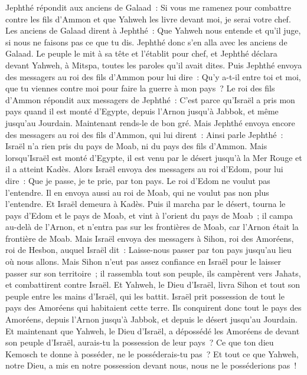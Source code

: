\begin{multicols}{2}
Jephthé répondit aux anciens de Galaad~: Si vous me ramenez pour combattre contre les fils d'Ammon et que Yahweh les livre devant moi, je serai votre chef.
Les anciens de Galaad dirent à Jephthé~: Que Yahweh nous entende et qu'il juge, si nous ne faisons pas ce que tu dis.
Jephthé donc s'en alla avec les anciens de Galaad. Le peuple le mit à sa tête et l'établit pour chef, et Jephthé déclara devant Yahweh, à Mitspa, toutes les paroles qu'il avait dites.
Puis Jephthé envoya des messagers au roi des fils d'Ammon pour lui dire~: Qu'y a-t-il entre toi et moi, que tu viennes contre moi pour faire la guerre à mon pays~?
Le roi des fils d'Ammon répondit aux messagers de Jephthé~: C'est parce qu'Israël a pris mon pays quand il est monté d'Egypte, depuis l'Arnon jusqu'à Jabbok, et même jusqu'au Jourdain. Maintenant rends-le de bon gré.
Mais Jephthé envoya encore des messagers au roi des fils d'Ammon,
qui lui dirent~: Ainsi parle Jephthé~: Israël n'a rien pris du pays de Moab, ni du pays des fils d'Ammon.
Mais lorsqu'Israël est monté d'Egypte, il est venu par le désert jusqu'à la Mer Rouge et il a atteint Kadès.
Alors Israël envoya des messagers au roi d'Edom, pour lui dire~: Que je passe, je te prie, par ton pays. Le roi d'Edom ne voulut pas l'entendre. Il en envoya aussi au roi de Moab, qui ne voulut pas non plus l'entendre. Et Israël demeura à Kadès.
Puis il marcha par le désert, tourna le pays d'Edom et le pays de Moab, et vint à l'orient du pays de Moab~; il campa au-delà de l'Arnon, et n'entra pas sur les frontières de Moab, car l'Arnon était la frontière de Moab.
Mais Israël envoya des messagers à Sihon, roi des Amoréens, roi de Hesbon, auquel Israël dit~: Laisse-nous passer par ton pays jusqu'au lieu où nous allons.
Mais Sihon n'eut pas assez confiance en Israël pour le laisser passer sur son territoire~; il rassembla tout son peuple, ils campèrent vers Jahats, et combattirent contre Israël.
Et Yahweh, le Dieu d'Israël, livra Sihon et tout son peuple entre les mains d'Israël, qui les battit. Israël prit possession de tout le pays des Amoréens qui habitaient cette terre.
Ils conquirent donc tout le pays des Amoréens, depuis l'Arnon jusqu'à Jabbok, et depuis le désert jusqu'au Jourdain.
Et maintenant que Yahweh, le Dieu d'Israël, a dépossédé les Amoréens de devant son peuple d'Israël, aurais-tu la possession de leur pays~?
Ce que ton dieu Kemosch te donne à posséder, ne le posséderais-tu pas~? Et tout ce que Yahweh, notre Dieu, a mis en notre possession devant nous, nous ne le posséderions pas~!

\end{multicols}
